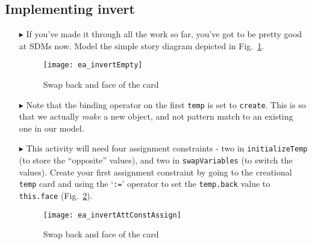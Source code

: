\newpage
\hypertarget{invertCard vis}{}
\subsection{Implementing invert}
\visHeader

\begin{itemize}

\vspace{0.5cm}

\item[$\blacktriangleright$] If you've made it through all the work so far, you've got to be pretty good at SDMs now. Model the simple story diagram
depicted in Fig.~\ref{fig:sdm_invertEmpty}.

\vspace{0.5cm}

\begin{figure}[htbp]
\begin{center}
  \texttt{[image: ea\_invertEmpty]}
  \caption{Swap back and face of the card}  
  \label{fig:sdm_invertEmpty}
\end{center}
\end{figure}

\item[$\blacktriangleright$] Note that the binding operator on the first \texttt{temp} is set to \texttt{create}. This is so that we actually \emph{make} a new
object, and not pattern match to an existing one in our model.

\item[$\blacktriangleright$] This activity will need four assignment constraints - two in \texttt{in\-it\-ia\-lize\-Temp} (to store the ``opposite'' values),
and two in \texttt{swapVariables} (to switch the values). Create your first assignment constraint by going to the creational \texttt{temp} card and using the
`\texttt{:=}' operator to set the \texttt{temp.back} value to \texttt{this.face} (Fig.~\ref{fig:sdm_invertAssignment}).

\begin{figure}[htbp]
\begin{center}
  \texttt{[image: ea\_invertAttConstAssign]}
  \caption{Swap back and face of the card}  
  \label{fig:sdm_invertAssignment}
\end{center}
\end{figure}

\clearpage

\vspace*{0.5cm}


\end{itemize}
